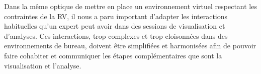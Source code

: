 Dans la même optique de mettre en place un environnement virtuel respectant les contraintes de la RV, il nous a paru important d'adapter les interactions habituelles qu'un expert peut avoir dans des sessions de visualisation et d'analyses. Ces interactions, trop complexes et trop cloisonnées dans des environnements de bureau, doivent être simplifiées et harmonisées afin de pouvoir faire cohabiter et communiquer les étapes complémentaires que sont la visualisation et l'analyse. %






